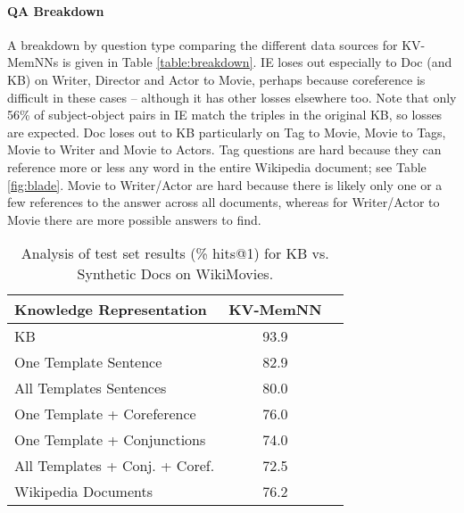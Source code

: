 \documentclass[11pt,letterpaper]{article}
\newcommand{\WikiMovies}{{\sc WikiMovies}\xspace}
\begin{document}
\paragraph{QA Breakdown}
A breakdown by question type comparing the different data sources for KV-MemNNs is given
in Table \ref{table:breakdown}. IE loses out especially to Doc (and KB) on
Writer, Director and Actor to Movie, perhaps because coreference is difficult in these cases --
although it has other losses elsewhere too. Note that only 56\% of
subject-object pairs in IE match the triples in the original KB, so losses are expected.
Doc loses out to KB particularly on Tag to Movie, Movie to Tags, Movie to Writer and
Movie to Actors. Tag questions
are hard because they can reference more or less any word in the entire
Wikipedia document; see Table \ref{fig:blade}. Movie to Writer/Actor are hard
because there is likely only one or a few references to the answer across all documents, whereas
for Writer/Actor to Movie there are more possible answers to find.


\begin{table}[t!]
	\begin{center}
          \begin{small}
  	\begin{tabular}{l|c|c|}
      	    Knowledge Representation   &  KV-MemNN  \\
     	    \hline
       	KB                               &   93.9    \\
      	One Template Sentence            &   82.9    \\
       	All Templates Sentences          &   80.0        \\
       	One Template + Coreference      &   76.0         \\
       	One Template + Conjunctions       &   74.0        \\
       	All Templates + Conj. + Coref.   &   72.5       \\
       	Wikipedia Documents              &    76.2   \\
  	 \end{tabular}
\caption{
	\label{tab:templateres}
              { Analysis of test set results (\% hits@1) for KB vs. Synthetic Docs on \WikiMovies.}}
          \end{small}
  	\end{center}
\end{table}
\end{document}
